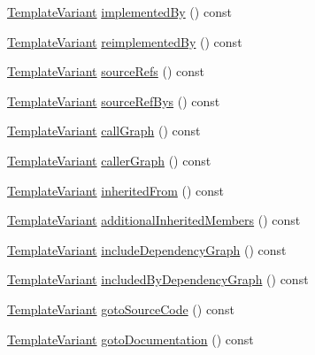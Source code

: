 \begin{DoxyCompactItemize}
\item 
\hyperlink{class_template_variant}{Template\+Variant} \hyperlink{class_translate_context_1_1_private_a3a19323296790b8c2410d281b3e74d3f}{implemented\+By} () const 
\item 
\hyperlink{class_template_variant}{Template\+Variant} \hyperlink{class_translate_context_1_1_private_a645015da5a124fe9d0fb603cd8389ef1}{reimplemented\+By} () const 
\item 
\hyperlink{class_template_variant}{Template\+Variant} \hyperlink{class_translate_context_1_1_private_aff56c89bde1196a5c8c0da231b99b84f}{source\+Refs} () const 
\item 
\hyperlink{class_template_variant}{Template\+Variant} \hyperlink{class_translate_context_1_1_private_a28212cc0ae5a2f1003b8a93a73db1f3b}{source\+Ref\+Bys} () const 
\item 
\hyperlink{class_template_variant}{Template\+Variant} \hyperlink{class_translate_context_1_1_private_a866ef5e60dbdc594b511c2c7c28e2fb6}{call\+Graph} () const 
\item 
\hyperlink{class_template_variant}{Template\+Variant} \hyperlink{class_translate_context_1_1_private_a29f2fdc30a629d26bdfb7a7bf6670688}{caller\+Graph} () const 
\item 
\hyperlink{class_template_variant}{Template\+Variant} \hyperlink{class_translate_context_1_1_private_a6997138ecbe2f009d216d33451992e5b}{inherited\+From} () const 
\item 
\hyperlink{class_template_variant}{Template\+Variant} \hyperlink{class_translate_context_1_1_private_ae4fd660b0c6f813c82e7fced89b169ab}{additional\+Inherited\+Members} () const 
\item 
\hyperlink{class_template_variant}{Template\+Variant} \hyperlink{class_translate_context_1_1_private_a8705750ce155c128703832c5b1449de4}{include\+Dependency\+Graph} () const 
\item 
\hyperlink{class_template_variant}{Template\+Variant} \hyperlink{class_translate_context_1_1_private_a0ae972dc245586bf8eac6e7f7dbaf26d}{included\+By\+Dependency\+Graph} () const 
\item 
\hyperlink{class_template_variant}{Template\+Variant} \hyperlink{class_translate_context_1_1_private_af603ac02dcb1e9f319d66641ab6f9d6c}{goto\+Source\+Code} () const 
\item 
\hyperlink{class_template_variant}{Template\+Variant} \hyperlink{class_translate_context_1_1_private_a2962dca9a7ac5bb0a80b4f9252d585b3}{goto\+Documentation} () const 
\item 

\end{DoxyCompactItemize}
